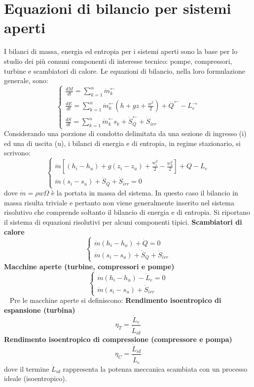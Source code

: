 \section{Equazioni di bilancio per sistemi aperti}
I bilanci di massa, energia ed entropia per i sistemi aperti sono la base per lo studio dei più
comuni componenti di interesse tecnico: pompe, compressori, turbine e scambiatori di calore. \newline
\newline
Le equazioni di bilancio, nella loro formulazione generale, sono:
\[
    \begin{cases}
        \frac{dM}{dt} = \sum_{k=1}^{n}\dot{m}_k^\leftarrow \\
        \frac{dE}{dt} = \sum_{k=1}^{n}\dot{m}_k^\leftarrow  \left(h + gz + \frac{w^2}{2}\right) + \dot{Q}^\leftarrow  - L_e^\rightarrow \\
        \frac{dS}{dt} = \sum_{k=1}^{n} \dot{m}_k^\leftarrow  s_k + \dot{S}_Q^\leftarrow + \dot{S}_{irr}
    \end{cases}
\]
Considerando una porzione di condotto delimitata da una sezione di ingresso (i) ed una di
uscita (u), i bilanci di energia e di entropia, in regime stazionario, si scrivono: 
\[
    \begin{cases}
        \dot{m}\left[ (h_i - h_u) + g(z_i-z_u) + \frac{w_i^2}{2} - \frac{w_u^2}{2}\right] + \dot{Q}-L_e\\
        \dot{m}(s_i-s_u) + \dot{S}_Q + \dot{S}_{irr} = 0
    \end{cases}
\]
dove $\dot{m} = \rho w \Omega$ è la portata in massa del sistema.\newline
In questo caso il bilancio in massa risulta triviale e pertanto non viene generalmente inserito
nel sistema risolutivo che comprende soltanto il bilancio di energia e di entropia. \newline
\newline
Si riportano il sistema di equazioni risolutivi per alcuni componenti tipici. \newline
\textbf{Scambiatori di calore}
\[
    \begin{cases}
        \dot{m} (h_i-h_u) + \dot{Q} = 0\\
        \dot{m} (s_i-s_u) + \dot{S}_Q + \dot{S}_{irr}
    \end{cases}
\]
\textbf{Macchine aperte (turbine, compressori e pompe)}
\[
    \begin{cases}
        \dot{m} (h_i-h_u) - \dot{L}_e = 0\\
        \dot{m} (s_i-s_u) + \dot{S}_{irr}
    \end{cases}
\]
\ \newline
Pre le macchine aperte si definiscono:\newline
\textbf{Rendimento isoentropico di espansione (turbina)}
\[
    \eta_{T} = \frac{\dot{L}_e}{\dot{L}_{id}}
\]
\textbf{Rendimento isoentropico di compressione (compressore e pompa)}
\[
    \eta_{C} = \frac{\dot{L}_{id}}{\dot{L}_{e}}
\]
dove il termine $\dot{L}_{id}$ rappresenta la potenza meccanica scambiata con un processo ideale (isoentropico).
